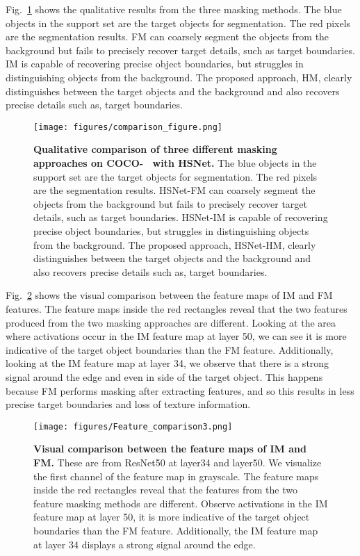 \documentclass[runningheads]{llncs}
\begin{document}
Fig.~\ref{fig:comparison} shows the qualitative results from the three masking methods. The blue objects in the support set are the target objects for segmentation. The red pixels are the segmentation results. FM can coarsely segment the objects from the background but fails to precisely recover target details, such as target boundaries. IM is capable of recovering precise object boundaries, but struggles in distinguishing objects from the background. The proposed approach, HM, clearly distinguishes between the target objects and the background and also recovers precise details such as, target boundaries.
\begin{figure}[!htp]
\centering
{\texttt{[image: figures/comparison\_figure.png]}}
\caption{ \small \textbf{Qualitative comparison of three different masking approaches on COCO-~\cite{lin2015microsoft} with HSNet.} The blue objects in the support set are the target objects for segmentation. The red pixels are the segmentation results. HSNet-FM can coarsely segment the objects from the background but fails to precisely recover target details, such as target boundaries. HSNet-IM is capable of recovering precise object boundaries, but struggles in distinguishing objects from the background. The proposed approach, HSNet-HM, clearly distinguishes between the target objects and the background and also recovers precise details such as, target boundaries.}
\label{fig:comparison}
\end{figure}

Fig.~\ref{fig:feature_difference} shows the visual comparison between the feature maps of IM and FM features. The feature maps inside the red rectangles reveal that the two features produced from the two masking approaches are different. Looking at the area where activations occur in the IM feature map at layer 50, we can see it is more indicative of the target object boundaries than the FM feature. Additionally, looking at the IM feature map at layer 34, we observe that there is a strong signal around the edge and even in side of the target object. This happens because FM performs masking after extracting features, and so this results in less precise target boundaries and loss of texture information. 
\begin{figure}[!htp]
\centering

{\texttt{[image: figures/Feature\_comparison3.png]}}
\caption{  \textbf{Visual comparison between the feature maps of IM and FM.} These are from ResNet50 at layer34 and layer50. We visualize the first channel of the feature map in grayscale. The feature maps inside the red rectangles reveal that the features from the two feature masking methods are different. Observe activations in the IM feature map at layer 50, it is more indicative of the target object boundaries than the FM feature. Additionally, the IM feature map at layer 34 displays a strong signal around the edge.}\label{fig:feature_difference}
\end{figure}
\end{document}
